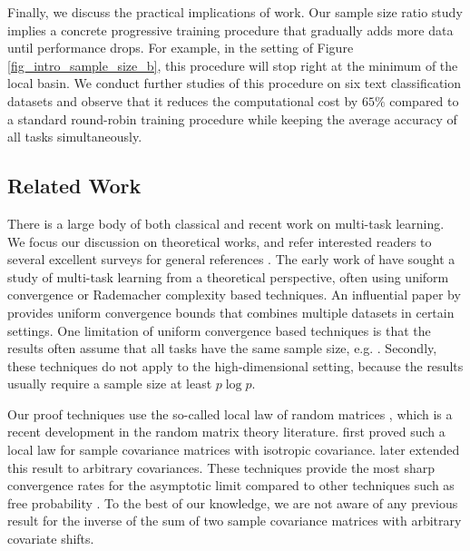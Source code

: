 Finally, we discuss the practical implications of work.
Our sample size ratio study implies a concrete progressive training procedure that gradually adds more data until performance drops.
For example, in the setting of Figure \ref{fig_intro_sample_size_b}, this procedure will stop right at the minimum of the local basin.
We conduct further studies of this procedure on six text classification datasets and observe that it reduces the computational cost by $65\%$ compared to a standard round-robin training procedure while keeping the average accuracy of all tasks simultaneously.



\subsection{Related Work}

There is a large body of both classical and recent work on multi-task learning.
We focus our discussion on theoretical works, and refer interested readers to several excellent surveys for general references \cite{PY09,R17,ZY17,V20}.
The early work of \citet{B00,BS03,M06} have sought a study of multi-task learning from a theoretical perspective, often using uniform convergence or Rademacher complexity based techniques.
An influential paper by \citet{BBCK10} provides uniform convergence bounds that combines multiple datasets in certain settings.
One limitation of uniform convergence based techniques is that the results often assume that all  tasks have the same sample size, e.g. \citet{B00,MPR16}.
Secondly, these techniques do not apply to the high-dimensional setting, because the results usually require a sample size at least $p \log p$.

Our proof techniques use the so-called local law of random matrices \cite{erdos2017dynamical}, which is a recent development in the random matrix theory literature.
\citet{isotropic} first proved such a local law for sample covariance matrices with isotropic covariance.
\citet{Anisotropic} later extended this result to arbitrary covariances.
These techniques provide the most sharp convergence rates for the asymptotic limit compared to other techniques such as free probability \cite{nica2006lectures}.
To the best of our knowledge, we are not aware of any previous result for the inverse of the sum of two sample covariance matrices with arbitrary covariate shifts.

